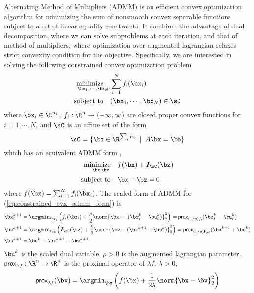 \documentclass[11pt]{article}
\renewcommand{\sI}{\boldsymbol{I}}
\newcommand{\minimize}{\text{minimize}\quad}
\newcommand{\subjectto}{\text{subject to}\quad}
\newcommand{\prox}{\textsf{prox}}
\begin{document}
Alternating Method of Multipliers (ADMM) is an efficient convex optimization algorithm for minimizing the sum of nonsmooth convex separable functions subject to a set of linear equality constraints. It combines the advantage of dual decomposition, where we can solve subproblems at each iteration, and that of method of multipliers, where optimization over augmented lagrangian relaxes strict convexity condition for the objective.\cite{boydDistributedOptimizationStatistical2011} Specifically, we are interested in solving the following constrained convex optimization problem
\begin{equation}
    \label{eq:constrained_cvx}
    \begin{aligned}
        \underset{\bx_1,\cdots,\bx_N}{\minimize}  & \sum_{i=1}^N f_i(\bx_i) \\
        \subjectto & (\bx_1,\cdots,\bx_N) \in \sC \\
    \end{aligned}
\end{equation}
where $\bx_i\in\R^{n_i}$, $f_i: \R^{n} \to (-\infty,\infty)$ are closed proper convex functions for $i=1,\cdots,N$, and $\sC$ is an affine set of the form
\[
    \sC = \{ \bx \in\R^{\sum_i n_i} \;\mid\; A \bx = \bb \}    
\]
which has an equivalent ADMM form \cite{boydDistributedOptimizationStatistical2011},
\begin{equation}
    \label{eq:constrained_cvx_admm_form}
    \begin{aligned}
        \underset{\bx,\bz}{\minimize}  & f(\bx) + \sI_{\sC}(\bz) \\
        \subjectto & \bx - \bz = 0 \\
    \end{aligned}
\end{equation}
where $f(\bx) = \sum_{i=1}^N f_i(\bx_i)$. The scaled form of ADMM for (\ref{eq:constrained_cvx_admm_form}) is 
\begin{align*}
    \bx_i^{k+1} 
        &= \argmin_{\bx_i} \left( f_i(\bx_i) + \frac{\rho}{2} \norm{\bx_i - (\bz_i^k - \bu_i^k)}_2^2 \right) 
        = \prox_{(1/\rho)f_i}(\bz_i^k - \bu_i^k) \\
    \bz^{k+1}
        &= \argmin_{\bz} \left( \sI_{\sC}(\bz) + \frac{\rho}{2} \norm{ \bz - (\bx^{k+1} + \bu^k) }_2^2 \right)
        = \prox_{(1/\rho)\sI_{\sC}}(\bx^{k+1} + \bu^k) \\
    \bu^{k+1} 
        &= \bu^k + \bx^{k+1} - \bz^{k+1}
\end{align*}
$\bu^{k}$ is the scaled dual variable. $\rho>0$ is the augmented lagrangian parameter. $\prox_{\lambda f}: \R^n \to \R^n$ is the proximal operator of $\lambda f$, $\lambda >0$, 
\[
    \prox_{\lambda f}(\bv) = \argmin_{\bx} \left( f(\bx) + \frac{1}{2\lambda} \norm{\bx-\bv}_2^2 \right)    
\]
\end{document}
